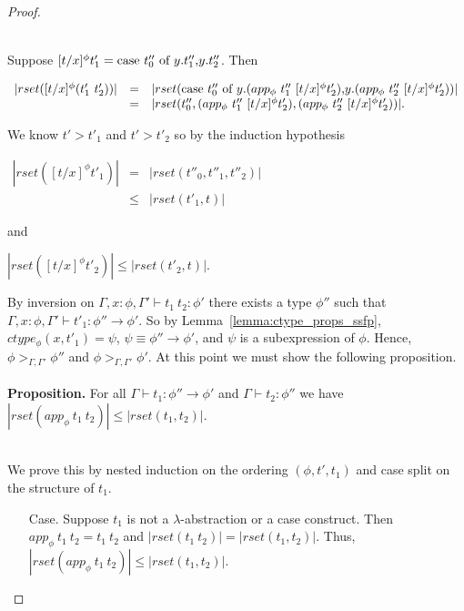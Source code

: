 \begin{proof}
\begin{itemize}
  \ \\
  \noindent
  Suppose $[t/x]^\phi t'_1 = \mbox{case}\ t''_0\ \text{of}\ y\text{.}t''_1\text{,}y\text{.}t''_2$. Then 
  \begin{center}
    \begin{math}
      \begin{array}{lll}
        |rset([t/x]^\phi (t'_1\ t'_2))| & = & |rset(\ccon{t''_0}{y}{(app_\phi\ t''_1\ [t/x]^\phi t'_2)}{(app_\phi\ t''_2\ [t/x]^\phi t'_2)})|\\
        & = & |rset(t''_0, (app_\phi\ t''_1\ [t/x]^\phi t'_2), (app_\phi\ t''_2\ [t/x]^\phi t'_2))|.
      \end{array}
    \end{math}
  \end{center}
  We know $t' > t'_1$ and $t' > t'_2$ so by the induction hypothesis
  \begin{center}
    \begin{math}
      \begin{array}{lll}
        |rset([t/x]^\phi t'_1)| & =    & |rset(t''_0, t''_1,t''_2)|\\
        & \leq & |rset(t'_1,t)|
      \end{array}
    \end{math}
  \end{center}
  and
  \begin{center}
    \begin{math}
      |rset([t/x]^\phi t'_2)| \leq |rset(t'_2,t)|.
    \end{math}
  \end{center}
  By inversion on $\Gamma,x:\phi,\Gamma' \vdash t_1\ t_2:\phi'$ there exists a type $\phi''$ such that
  $\Gamma,x:\phi,\Gamma' \vdash t'_1:\phi'' \to \phi'$.  So by Lemma~\ref{lemma:ctype_props_ssfp},
  $ctype_\phi(x,t'_1) = \psi$, $\psi \equiv \phi'' \to \phi'$, and $\psi$ is a subexpression of $\phi$.  Hence,
  $\phi >_{\Gamma,\Gamma'} \phi''$ and $\phi >_{\Gamma,\Gamma'} \phi'$.  At this point we must show the following
  proposition.
  \ \\
  {\bf Proposition.}  For all $\Gamma \vdash t_1:\phi'' \to \phi'$ and $\Gamma \vdash t_2:\phi''$ we have 
  $|rset(app_\phi\ t_1\ t_2)| \leq |rset(t_1,t_2)|$.
  
  \ \\
  We prove this by nested induction on the ordering $(\phi, t', t_1)$ and case split on the structure of $t_1$. 
  
  \begin{itemize}
  \item[Case.] Suppose $t_1$ is not a $\lambda$-abstraction or a case construct.  Then
    $app_\phi\ t_1\ t_2 = t_1\ t_2$ and $|rset(t_1\ t_2)| = |rset(t_1,t_2)|$.  Thus,
    $|rset(app_\phi\ t_1\ t_2)| \leq |rset(t_1,t_2)|$.  
    

\end{itemize}
\end{itemize}
\end{proof}
